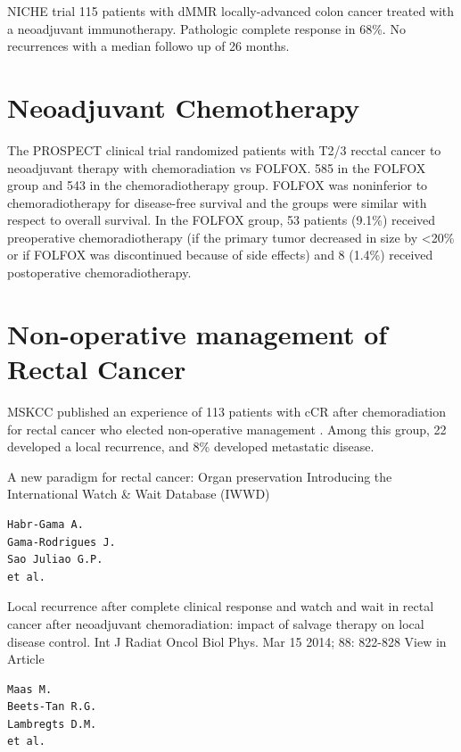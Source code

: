 \documentclass[
]{book}
\begin{document}
NICHE trial \citep{chalabi1949} 115 patients with dMMR locally-advanced colon cancer treated with a neoadjuvant immunotherapy. Pathologic complete response in 68\%. No recurrences with a median followo up of 26 months.

\hypertarget{neoadjuvant-chemotherapy-1}{%
\chapter{Neoadjuvant Chemotherapy}\label{neoadjuvant-chemotherapy-1}}

The PROSPECT clinical trial \citep{schrag322} randomized patients with T2/3 recctal cancer to neoadjuvant therapy with chemoradiation vs FOLFOX. 585 in the FOLFOX group and 543 in the chemoradiotherapy group. FOLFOX was noninferior to chemoradiotherapy for disease-free survival and the groups were similar with respect to overall survival. In the FOLFOX group, 53 patients (9.1\%) received preoperative chemoradiotherapy (if the primary tumor decreased in size by \textless20\% or if FOLFOX was discontinued because of side effects) and 8 (1.4\%) received postoperative chemoradiotherapy.

\hypertarget{non-operative-management-of-rectal-cancer}{%
\chapter{Non-operative management of Rectal Cancer}\label{non-operative-management-of-rectal-cancer}}

MSKCC published an experience of 113 patients with cCR after chemoradiation for rectal cancer who elected non-operative management \citep{smithe185896}. Among this group, 22 developed a local recurrence, and 8\% developed metastatic disease.\citep{smith657}

A new paradigm for rectal cancer: Organ preservation
Introducing the International Watch \& Wait Database (IWWD) \citep{beets1562}

\begin{verbatim}
Habr-Gama A.
Gama-Rodrigues J.
Sao Juliao G.P.
et al.
\end{verbatim}

Local recurrence after complete clinical response and watch and wait in rectal cancer after neoadjuvant chemoradiation: impact of salvage therapy on local disease control.
Int J Radiat Oncol Biol Phys. Mar 15 2014; 88: 822-828
View in Article

\begin{verbatim}
Maas M.
Beets-Tan R.G.
Lambregts D.M.
et al.
\end{verbatim}
\end{document}
